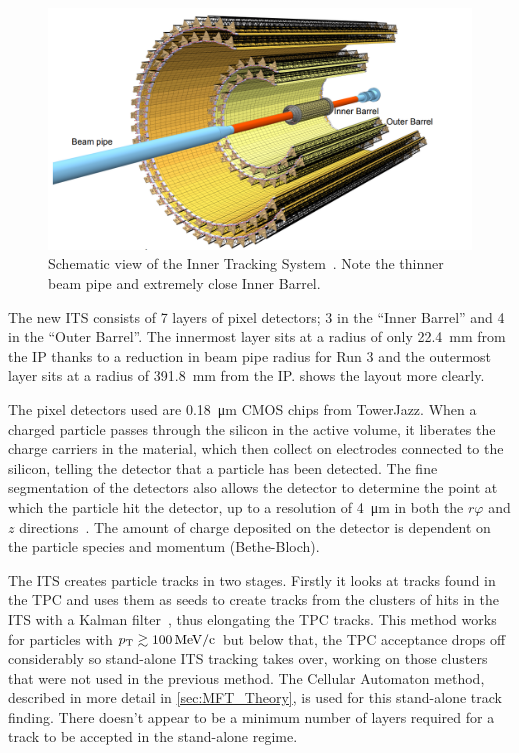 \begin{figure}[h]
    \begin{center}
        \includegraphics[width=.8\textwidth]{Figs/ITS_Schematic.png}
        \caption{Schematic view of the Inner Tracking System~\cite{ITS_Upgrade_TDR}. Note the thinner beam pipe and extremely close Inner Barrel.}
        \label{fig:ITS_Schematic}
    \end{center}
\end{figure}

The new ITS consists of 7 layers of pixel detectors; 3 in the ``Inner Barrel'' and 4 in the ``Outer Barrel''. The innermost layer sits at a radius of only \SI{22.4}{\milli\metre} from the IP thanks to a reduction in beam pipe radius for Run 3 and the outermost layer sits at a radius of \SI{391.8}{\milli\metre} from the IP.  shows the layout more clearly. 

The pixel detectors used are \SI{0.18}{\micro\metre} CMOS chips from TowerJazz. When a charged particle passes through the silicon in the active volume, it liberates the charge carriers in the material, which then collect on electrodes connected to the silicon, telling the detector that a particle has been detected. The fine segmentation of the detectors also allows the detector to determine the point at which the particle hit the detector, up to a resolution of \SI{4}{\micro\metre} in both the $r\varphi$ and $z$ directions~\cite{ITS_Upgrade_TDR}. The amount of charge deposited on the detector is dependent on the particle species and momentum (Bethe-Bloch). 

The ITS creates particle tracks in two stages. Firstly it looks at tracks found in the TPC and uses them as seeds to create tracks from the clusters of hits in the ITS with a Kalman filter~\cite{Kalman}, thus elongating the TPC tracks. This method works for particles with $p_\mathrm{T}\gtrsim\SI{100}{\mega\electronvolt\per c}$ but below that, the TPC acceptance drops off considerably so stand-alone ITS tracking takes over, working on those clusters that were not used in the previous method. The Cellular Automaton method, described in more detail in \cref{sec:MFT_Theory}, is used for this stand-alone track finding. There doesn't appear to be a minimum number of layers required for a track to be accepted in the stand-alone regime. 

